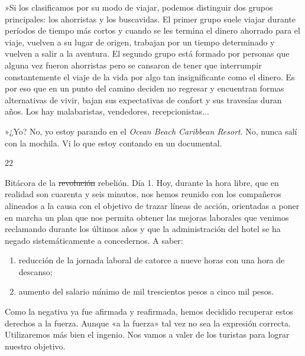 \documentclass[12pt,twoside,openright,a5paper]{book}
\begin{document}
»Si los clasificamos por su modo de viajar, podemos distinguir dos grupos
principales: los ahorristas y los buscavidas. El primer grupo suele viajar
durante períodos de tiempo más cortos y cuando se les termina el dinero
ahorrado para el viaje, vuelven a su lugar de origen, trabajan por un
tiempo determinado y vuelven a salir a la aventura. El segundo grupo está
formado por personas que alguna vez fueron ahorristas pero se cansaron
de tener que interrumpir constantemente el viaje de la vida por algo tan
insignificante como el dinero. Es por eso que en un punto del camino
deciden no regresar y encuentran formas alternativas de vivir, bajan sus
expectativas de confort y sus travesías duran años. Los hay malabaristas,
vendedores, recepcionistas...

»¿Yo? No, yo estoy parando en el \emph{Ocean Beach Caribbean Resort}. No, nunca
salí con la mochila. Vi lo que estoy contando en un documental.

\vspace{0.5cm}
\afterpage{}
\hrulefill \hspace{0.1cm}\decofourleft\hspace{0.2cm} 22 \hspace{0.2cm}\decofourright \hspace{0.1cm}\hrulefill

\nopagebreak

\vspace{0.5cm}

\nopagebreak

Bitácora de la \st{revolución} rebelión. Día 1. Hoy, durante la hora libre, que en
realidad son cuarenta y seis minutos, nos hemos reunido con los compañeros alineados
a la causa con el objetivo de trazar líneas de acción, orientadas a poner
en marcha un plan que nos permita obtener las mejoras laborales que venimos
reclamando durante los últimos años y que la administración del hotel
se ha negado sistemáticamente a concedernos. A saber:

\begin{enumerate}
\item reducción de la jornada laboral de catorce a nueve horas con una hora de descanso;
\item aumento del salario mínimo de mil trescientos pesos a cinco mil pesos.
\end{enumerate}

Como la negativa ya fue afirmada y reafirmada, hemos decidido recuperar
estos derechos a la fuerza. Aunque «a la fuerza» tal vez no sea la expresión
correcta. Utilizaremos más bien el ingenio. Nos vamos a valer de los turistas
para lograr nuestro objetivo.
\end{document}
